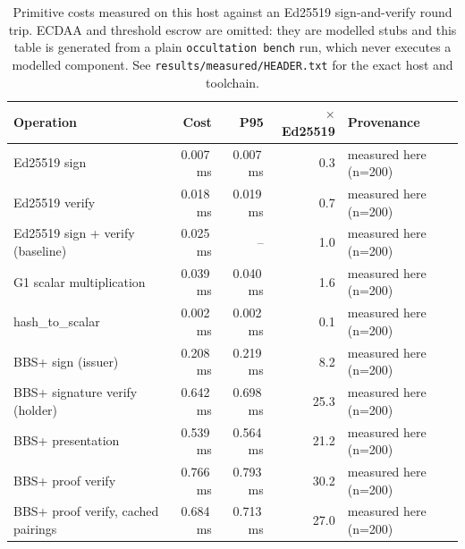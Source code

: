 \begin{table}[h]
\centering\small
\begin{tabular}{lrrrl}
\toprule
Operation & Cost & P95 & $\times$Ed25519 & Provenance \\
\midrule
Ed25519 sign & 0.007\,ms & 0.007\,ms & 0.3 & measured here (n=200) \\
Ed25519 verify & 0.018\,ms & 0.019\,ms & 0.7 & measured here (n=200) \\
Ed25519 sign + verify (baseline) & 0.025\,ms & -- & 1.0 & measured here (n=200) \\
G1 scalar multiplication & 0.039\,ms & 0.040\,ms & 1.6 & measured here (n=200) \\
hash\_to\_scalar & 0.002\,ms & 0.002\,ms & 0.1 & measured here (n=200) \\
BBS+ sign (issuer) & 0.208\,ms & 0.219\,ms & 8.2 & measured here (n=200) \\
BBS+ signature verify (holder) & 0.642\,ms & 0.698\,ms & 25.3 & measured here (n=200) \\
BBS+ presentation & 0.539\,ms & 0.564\,ms & 21.2 & measured here (n=200) \\
BBS+ proof verify & 0.766\,ms & 0.793\,ms & 30.2 & measured here (n=200) \\
BBS+ proof verify, cached pairings & 0.684\,ms & 0.713\,ms & 27.0 & measured here (n=200) \\
\bottomrule
\end{tabular}
\caption{Primitive costs measured on this host against an Ed25519 sign-and-verify round trip. ECDAA and threshold escrow are omitted: they are modelled stubs and this table is generated from a plain \texttt{occultation bench} run, which never executes a modelled component. See \texttt{results/measured/HEADER.txt} for the exact host and toolchain.}
\label{tab:primitives}
\end{table}
